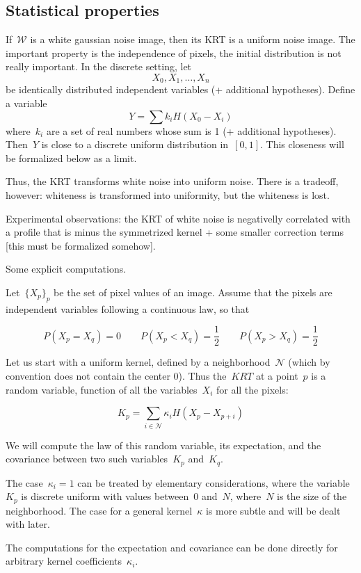 \documentclass[12pt]{article}                  %
\begin{document}
\subsection{Statistical properties}

If~$\mathcal{W}$ is a white gaussian noise image, then its KRT is a uniform
noise image.  The important property is the independence of pixels, the
initial distribution is not really important.  In the discrete setting, let
\[
	X_0,X_1,\ldots,X_n
\]
be identically distributed independent variables (+ additional hypotheses).
Define a variable
\[
	Y = \sum k_i H(X_0-X_i)
\]
where~$k_i$ are a set of real numbers whose sum is 1 (+ additional
hypotheses).  Then~$Y$ is close to a discrete uniform distribution
in~$[0,1]$.  This closeness will be formalized below as a limit.

Thus, the KRT transforms white noise into uniform noise.  There is a
tradeoff, however: whiteness is transformed into uniformity, but the
whiteness is lost.

Experimental observations: the KRT of white noise is negativelly correlated
with a profile that is minus the symmetrized kernel + some smaller
correction terms [this must be formalized somehow].

\bigskip

Some explicit computations.

Let~$\{X_p\}_p$ be the set of pixel values of an image.  Assume that the
pixels are independent variables following a continuous law, so that

$$
P(X_p=X_q)=0
\qquad
P(X_p<X_q)=\frac12
\qquad
P(X_p>X_q)=\frac12
$$

Let us start with a uniform kernel, defined by a neighborhood~$\mathcal{N}$
(which by convention does not contain the center 0).
Thus the~$KRT$ at a point~$p$ is a random variable, function of all the
variables~$X_i$ for all the pixels:

\[
	K_p = \sum_{i\in\mathcal{N}} \kappa_i H(X_p - X_{p+i})
\]

We will compute the law of this random variable, its expectation, and the
covariance between two such variables~$K_p$ and~$K_q$.

The case~$\kappa_i=1$ can be treated by elementary considerations, where the
variable~$K_p$ is discrete uniform with values between~$0$ and~$N$,
where~$N$ is the size of the neighborhood.
The case for a general kernel~$\kappa$ is more subtle and will be dealt with
later.

The computations for the expectation and covariance can be done directly for
arbitrary kernel coefficients~$\kappa_i$.
\end{document}
